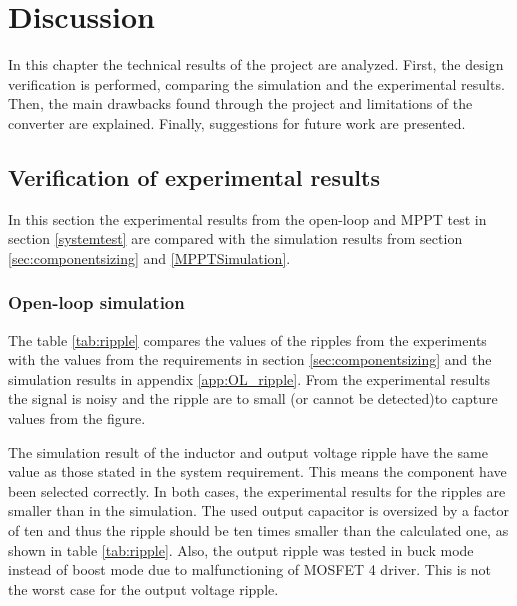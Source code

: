\chapter{Discussion}

In this chapter the technical results of the project are analyzed. First, the design verification is performed, comparing the simulation and the experimental results. Then, the main drawbacks found through the project and limitations of the converter are explained. Finally, suggestions for future work are presented.

\section{Verification of experimental results} \label{Experiment_verification}
In this section the experimental results from the open-loop and MPPT test in section \ref{systemtest} are compared with the simulation results from section \ref{sec:componentsizing} and \ref{MPPTSimulation}.

\subsection{Open-loop simulation} \label{ol_discussion}


The table \ref{tab:ripple} compares the values of the ripples from the experiments with the values from the requirements in section \ref{sec:componentsizing} and the simulation results in appendix \ref{app:OL_ripple}. 
From the experimental results the signal is noisy and the ripple are to small (or cannot be detected)to capture values from the figure. 

The simulation result of the inductor and output voltage ripple have the same value as those stated in the system requirement. This means the component have been selected correctly. 
In both cases, the experimental results for the ripples are smaller than in the simulation. The used output capacitor is oversized by a factor of ten and thus the ripple should be ten times smaller than the calculated one, as shown in table \ref{tab:ripple}. Also, the output ripple was tested in buck mode instead of boost mode due to malfunctioning of MOSFET 4 driver. This is not the worst case for the output voltage ripple.

